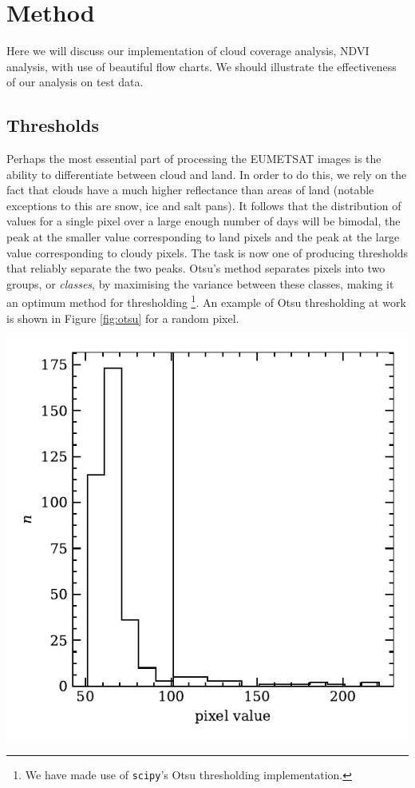 \section{Method}

Here we will discuss our implementation of cloud coverage analysis,
NDVI analysis, with use of beautiful flow charts. We should illustrate
the effectiveness of our analysis on test data.

\subsection{Thresholds}
Perhaps the most essential part of processing the EUMETSAT images is the ability
to differentiate between cloud and land. In order to do this, we rely on the
fact that clouds have a much higher reflectance than areas of land (notable
exceptions to this are snow, ice and salt pans). It follows that the
distribution of values for a single pixel over a large enough number of days
will be bimodal, the peak at the smaller value corresponding to land pixels and
the peak at the large value corresponding to cloudy pixels. The task is now one
of producing thresholds that reliably separate the two peaks. Otsu's method \cite{gonzalez2008} separates pixels into two groups, or \emph{classes}, by maximising the variance between these classes, making it an optimum method for thresholding \footnote{We have made use of \texttt{scipy}'s Otsu thresholding implementation.}. An example of Otsu thresholding at work is shown in Figure \ref{fig:otsu} for a random pixel.
\begin{center}
    \includegraphics[width=\linewidth]{figures/otsu_bimodal.pdf}
    \label{fig:otsu}
\end{center}
